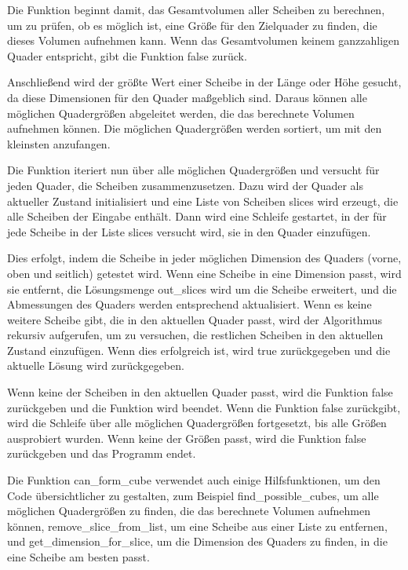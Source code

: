 \documentclass[a4paper,10pt,ngerman]{scrartcl}
\begin{document}
    Die Funktion beginnt damit, das Gesamtvolumen aller Scheiben zu berechnen, um zu prüfen, ob es möglich ist, eine Größe für den Zielquader zu finden, die dieses Volumen aufnehmen kann.
    Wenn das Gesamtvolumen keinem ganzzahligen Quader entspricht, gibt die Funktion false zurück.

    Anschließend wird der größte Wert einer Scheibe in der Länge oder Höhe gesucht, da diese Dimensionen für den Quader maßgeblich sind.
    Daraus können alle möglichen Quadergrößen abgeleitet werden, die das berechnete Volumen aufnehmen können.
    Die möglichen Quadergrößen werden sortiert, um mit den kleinsten anzufangen.

    Die Funktion iteriert nun über alle möglichen Quadergrößen und versucht für jeden Quader, die Scheiben zusammenzusetzen.
    Dazu wird der Quader als aktueller Zustand initialisiert und eine Liste von Scheiben slices wird erzeugt, die alle Scheiben der Eingabe enthält.
    Dann wird eine Schleife gestartet, in der für jede Scheibe in der Liste slices versucht wird, sie in den Quader einzufügen.

    Dies erfolgt, indem die Scheibe in jeder möglichen Dimension des Quaders (vorne, oben und seitlich) getestet wird.
    Wenn eine Scheibe in eine Dimension passt, wird sie entfernt, die Lösungsmenge out\_slices wird um die Scheibe erweitert, und die Abmessungen des Quaders werden entsprechend aktualisiert.
    Wenn es keine weitere Scheibe gibt, die in den aktuellen Quader passt, wird der Algorithmus rekursiv aufgerufen, um zu versuchen, die restlichen Scheiben in den aktuellen Zustand einzufügen.
    Wenn dies erfolgreich ist, wird true zurückgegeben und die aktuelle Lösung wird zurückgegeben.

    Wenn keine der Scheiben in den aktuellen Quader passt, wird die Funktion false zurückgeben und die Funktion wird beendet.
    Wenn die Funktion false zurückgibt, wird die Schleife über alle möglichen Quadergrößen fortgesetzt, bis alle Größen ausprobiert wurden.
    Wenn keine der Größen passt, wird die Funktion false zurückgeben und das Programm endet.

    Die Funktion can\_form\_cube verwendet auch einige Hilfsfunktionen, um den Code übersichtlicher zu gestalten,
    zum Beispiel find\_possible\_cubes, um alle möglichen Quadergrößen zu finden, die das berechnete Volumen aufnehmen können, remove\_slice\_from\_list,
    um eine Scheibe aus einer Liste zu entfernen, und get\_dimension\_for\_slice, um die Dimension des Quaders zu finden, in die eine Scheibe am besten passt.
\end{document}
